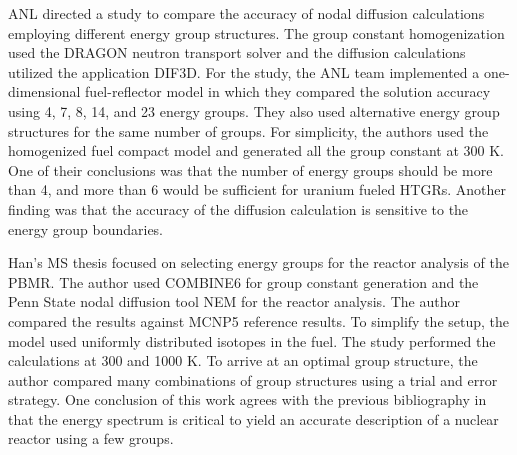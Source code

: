 \gls{ANL} directed a study \cite{lee_status_2006} to compare the accuracy of nodal diffusion calculations employing different energy group structures.
The group constant homogenization used the DRAGON neutron transport solver and the diffusion calculations utilized the application DIF3D.
For the study, the ANL team implemented a one-dimensional fuel-reflector model in which they compared the solution accuracy using 4, 7, 8, 14, and 23 energy groups.
They also used alternative energy group structures for the same number of groups.
For simplicity, the authors used the homogenized fuel compact model and generated all the group constant at 300 K.
One of their conclusions was that the number of energy groups should be more than 4, and more than 6 would be sufficient for uranium fueled HTGRs.
Another finding was that the accuracy of the diffusion calculation is sensitive to the energy group boundaries.


Han's MS thesis \cite{han_sensitivity_2008} focused on selecting energy groups for the reactor analysis of the \gls{PBMR}.
The author used COMBINE6 \cite{grimesey_combinepc-portable_1994} for group constant generation and the Penn State nodal diffusion tool NEM \cite{bandini_three-dimensional_1990} for the reactor analysis.
The author compared the results against MCNP5 reference results.
To simplify the setup, the model used uniformly distributed isotopes in the fuel.
The study performed the calculations at 300 and 1000 K.
To arrive at an optimal group structure, the author compared many combinations of group structures using a trial and error strategy.
One conclusion of this work agrees with the previous bibliography \cite{gulf_oil_company_nuclear_1973} \cite{duderstadt_nuclear_1976} in that the energy spectrum is critical to yield an accurate description of a nuclear reactor using a few groups.


